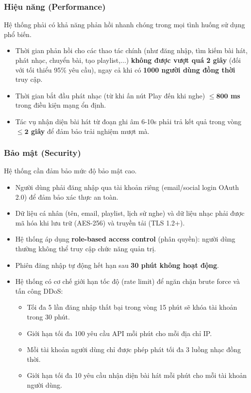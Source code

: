\documentclass[a4paper]{article}
\begin{document}
\subsubsection{Hiệu năng (Performance)}
  Hệ thống phải có khả năng phản hồi nhanh chóng trong mọi tình huống sử dụng phổ biến.
  \begin{itemize}
      \item Thời gian phản hồi cho các thao tác chính (như đăng nhập, tìm kiếm bài hát, phát nhạc, chuyển bài, tạo playlist,...) \textbf{không được vượt quá 2 giây} (đối với tối thiểu 95\% yêu cầu), ngay cả khi có \textbf{1000 người dùng đồng thời} truy cập.
      \item Thời gian bắt đầu phát nhạc (từ khi ấn nút Play đến khi nghe) \textbf{$\leq \mathbf{800}$ ms} trong điều kiện mạng ổn định.
      \item Tác vụ nhận diện bài hát từ đoạn ghi âm 6-10s phải trả kết quả trong vòng \textbf{$\leq \mathbf{2}$ giây} để đảm bảo trải nghiệm mượt mà.
  \end{itemize}

\subsubsection{Bảo mật (Security)}
  Hệ thống cần đảm bảo mức độ bảo mật cao.
  \begin{itemize}
      \item Người dùng phải đăng nhập qua tài khoản riêng (email/social login OAuth 2.0) để đảm bảo xác thực an toàn.
      \item Dữ liệu cá nhân (tên, email, playlist, lịch sử nghe) và dữ liệu nhạc phải được mã hóa khi lưu trữ (AES-256) và truyền tải (TLS 1.2+).
      \item Hệ thống áp dụng \textbf{role-based access control} (phân quyền): người dùng thường không thể truy cập chức năng quản trị.
      \item Phiên đăng nhập tự động hết hạn sau \textbf{30 phút không hoạt động}.
      \item Hệ thống có cơ chế giới hạn tốc độ (rate limit) để ngăn chặn brute force và tấn công DDoS:
      \begin{itemize}
          \item Tối đa 5 lần đăng nhập thất bại trong vòng 15 phút sẽ khóa tài khoản trong 30 phút.
          \item Giới hạn tối đa 100 yêu cầu API mỗi phút cho mỗi địa chỉ IP.
          \item Mỗi tài khoản người dùng chỉ được phép phát tối đa 3 luồng nhạc đồng thời.
          \item Giới hạn tối đa 10 yêu cầu nhận diện bài hát mỗi phút cho mỗi tài khoản người dùng.
      \end{itemize}
  \end{itemize}
\end{document}
